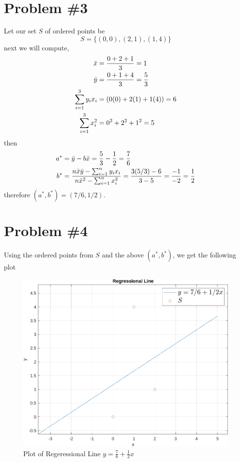 \documentclass{article}
\begin{document}
\section*{Problem \#3}
Let our set $S$ of ordered points be
\begin{equation*}
    S = \{(0,0), (2,1), (1,4)\}
\end{equation*}
next we will compute,
\begin{align*}
    \Bar{x} &= \frac{0 + 2 + 1}{3} = 1\\
    \Bar{y} &= \frac{0 + 1 + 4}{3} = \frac{5}{3} \\
    \sum_{i=1}^3y_ix_i &= (0(0) + 2(1) + 1(4)) = 6\\
    \sum_{i=1}^3x_i^2 &= 0^2 + 2^2 + 1^2 = 5
\end{align*}
then
\begin{align*}
    a^* &= \Bar{y} - b\Bar{x} = \frac{5}{3} - \frac{1}{2} = \frac{7}{6}\\
    b^* &=\frac{n\Bar{x}\Bar{y}- \sum_{i=1}^ny_ix_i}{n\Bar{x}^2 - \sum_{i=1}^nx_i^2} = \frac{3(5/3) - 6}{3 - 5} = \frac{-1}{-2} = \frac{1}{2}
\end{align*}
therefore $(a^*,b^*) = (7/6, 1/2)$.

\section*{Problem \#4}
Using the ordered points from $S$ and the above $(a^*,b^*)$, we get the following plot

\begin{figure}[H]
    \centering
    \includegraphics[scale=0.6]{4800A.png}
    \caption{Plot of Regeressional Line $y = \frac{7}{6} + \frac{1}{2}x$}
    \label{fig:my_label}
\end{figure}
\end{document}
